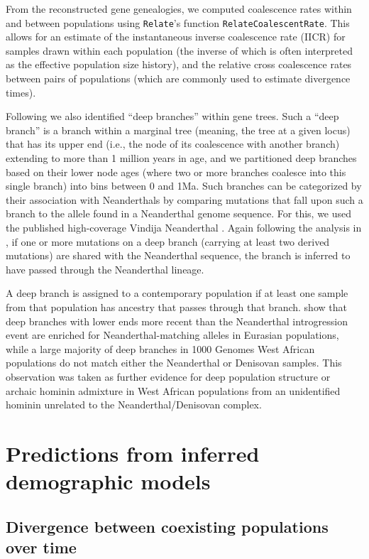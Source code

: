 \documentclass[]{article}
\newcommand{\Relate}{\texttt{Relate}\xspace}
\begin{document}
From the reconstructed gene genealogies, we computed coalescence rates within
and between populations using \Relate’s function \texttt{RelateCoalescentRate}.
This allows for an estimate of the instantaneous inverse coalescence rate
(IICR) for samples drawn within each population (the inverse of which is often
interpreted as the effective population size history), and the relative cross
coalescence rates between pairs of populations (which are commonly used to
estimate divergence times).

Following \citet{Speidel2019-nj} we also identified “deep branches” within gene
trees. Such a “deep branch” is a branch within a marginal tree (meaning, the
tree at a given locus) that has its upper end (i.e., the node of its
coalescence with another branch) extending to more than 1 million years in age,
and we partitioned deep branches based on their lower node ages (where two or
more branches coalesce into this single branch) into bins between 0 and 1Ma.
Such branches can be categorized by their association with Neanderthals by
comparing mutations that fall upon such a branch to the allele found in a
Neanderthal genome sequence. For this, we used the published high-coverage
Vindija Neanderthal \citep{Prufer2017-kk}. Again following the analysis in
\citet{Speidel2019-nj}, if one or more mutations on a deep branch (carrying at
least two derived mutations) are shared with the Neanderthal sequence, the
branch is inferred to have passed through the Neanderthal lineage.

A deep branch is assigned to a contemporary population if at least one sample
from that population has ancestry that passes through that branch.
\citet{Speidel2019-nj} show that deep branches with lower ends more recent than
the Neanderthal introgression event are enriched for Neanderthal-matching
alleles in Eurasian populations, while a large majority of deep branches in
1000 Genomes West African populations do not match either the Neanderthal or
Denisovan samples. This observation was taken as further evidence for deep
population structure or archaic hominin admixture in West African populations from an
unidentified hominin unrelated to the Neanderthal/Denisovan complex.

\section{Predictions from inferred demographic models}

\subsection{Divergence between coexisting populations over time}
\end{document}
